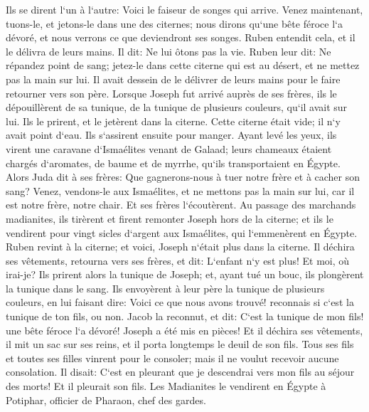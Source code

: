 \verse Ils se dirent l`un à l`autre: Voici le faiseur de songes qui arrive. 
\verse Venez maintenant, tuons-le, et jetons-le dans une des citernes; nous dirons qu`une bête féroce l`a dévoré, et nous verrons ce que deviendront ses songes. 
\verse Ruben entendit cela, et il le délivra de leurs mains. Il dit: Ne lui ôtons pas la vie. 
\verse Ruben leur dit: Ne répandez point de sang; jetez-le dans cette citerne qui est au désert, et ne mettez pas la main sur lui. Il avait dessein de le délivrer de leurs mains pour le faire retourner vers son père. 
\verse Lorsque Joseph fut arrivé auprès de ses frères, ils le dépouillèrent de sa tunique, de la tunique de plusieurs couleurs, qu`il avait sur lui. 
\verse Ils le prirent, et le jetèrent dans la citerne. Cette citerne était vide; il n`y avait point d`eau. 
\verse Ils s`assirent ensuite pour manger. Ayant levé les yeux, ils virent une caravane d`Ismaélites venant de Galaad; leurs chameaux étaient chargés d`aromates, de baume et de myrrhe, qu`ils transportaient en Égypte. 
\verse Alors Juda dit à ses frères: Que gagnerons-nous à tuer notre frère et à cacher son sang? 
\verse Venez, vendons-le aux Ismaélites, et ne mettons pas la main sur lui, car il est notre frère, notre chair. Et ses frères l`écoutèrent. 
\verse Au passage des marchands madianites, ils tirèrent et firent remonter Joseph hors de la citerne; et ils le vendirent pour vingt sicles d`argent aux Ismaélites, qui l`emmenèrent en Égypte. 
\verse Ruben revint à la citerne; et voici, Joseph n`était plus dans la citerne. Il déchira ses vêtements, 
\verse retourna vers ses frères, et dit: L`enfant n`y est plus! Et moi, où irai-je? 
\verse Ils prirent alors la tunique de Joseph; et, ayant tué un bouc, ils plongèrent la tunique dans le sang. 
\verse Ils envoyèrent à leur père la tunique de plusieurs couleurs, en lui faisant dire: Voici ce que nous avons trouvé! reconnais si c`est la tunique de ton fils, ou non. 
\verse Jacob la reconnut, et dit: C`est la tunique de mon fils! une bête féroce l`a dévoré! Joseph a été mis en pièces! 
\verse Et il déchira ses vêtements, il mit un sac sur ses reins, et il porta longtemps le deuil de son fils. 
\verse Tous ses fils et toutes ses filles vinrent pour le consoler; mais il ne voulut recevoir aucune consolation. Il disait: C`est en pleurant que je descendrai vers mon fils au séjour des morts! Et il pleurait son fils. 
\verse Les Madianites le vendirent en Égypte à Potiphar, officier de Pharaon, chef des gardes. 

